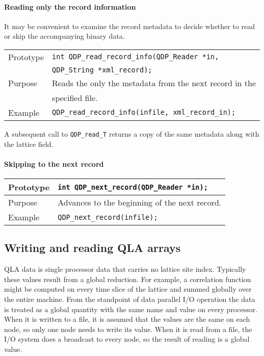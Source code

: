 \documentclass{article}
\newcommand{\QMDhandle}{{\tt QDP\_String }}
\begin{document}
\paragraph{Reading only the record information}

It may be convenient to examine the record metadata to decide whether
to read or skip the accompanying binary data.

\begin{flushleft}
  \begin{tabular}{|l|l|}
  \hline
  Prototype      & \verb|int QDP_read_record_info(QDP_Reader *in,|\\
                 &  \QMDhandle \verb|*xml_record);|\\
    \hline
  Purpose        & Reads the only the metadata from the next record in the \\
                 & specified file. \\
   \hline
  Example  & \verb|QDP_read_record_info(infile, xml_record_in);| \\
   \hline
 \end{tabular}
\end{flushleft}
%
A subsequent call to \verb|QDP_read_T| returns a copy of the same
metadata along with the lattice field.

\paragraph{Skipping to the next record}

\begin{flushleft}
  \begin{tabular}{|l|l|}
  \hline
  Prototype      & \verb|int QDP_next_record(QDP_Reader *in);|\\
    \hline
  Purpose        & Advances to the beginning of the next record. \\
   \hline
  Example  & \verb|QDP_next_record(infile);| \\
   \hline
 \end{tabular}
\end{flushleft}
%
\subsection{Writing and reading QLA arrays}

QLA data is single processor data that carries no lattice site index.
Typically these values result from a global reduction. For example, a
correlation function might be computed on every time slice of the
lattice and summed globally over the entire machine.  From the
standpoint of data parallel I/O operation the data is treated as a
global quantity with the same name and value on every processor.  When
it is written to a file, it is assumed that the values are the same on
each node, so only one node needs to write its value.  When it is read
from a file, the I/O system does a broadcast to every node, so the
result of reading is a global value.
\end{document}
